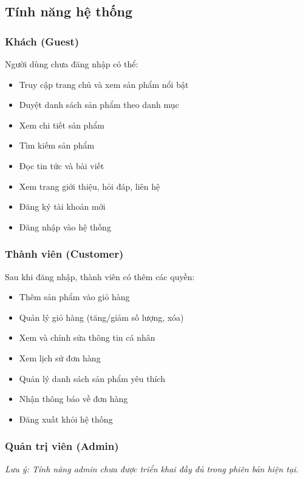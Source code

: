 \subsection{Tính năng hệ thống}

\subsubsection{Khách (Guest)}

Người dùng chưa đăng nhập có thể:
\begin{itemize}
    \item Truy cập trang chủ và xem sản phẩm nổi bật
    \item Duyệt danh sách sản phẩm theo danh mục
    \item Xem chi tiết sản phẩm
    \item Tìm kiếm sản phẩm
    \item Đọc tin tức và bài viết
    \item Xem trang giới thiệu, hỏi đáp, liên hệ
    \item Đăng ký tài khoản mới
    \item Đăng nhập vào hệ thống
\end{itemize}

\subsubsection{Thành viên (Customer)}

Sau khi đăng nhập, thành viên có thêm các quyền:
\begin{itemize}
    \item Thêm sản phẩm vào giỏ hàng
    \item Quản lý giỏ hàng (tăng/giảm số lượng, xóa)
    \item Xem và chỉnh sửa thông tin cá nhân
    \item Xem lịch sử đơn hàng
    \item Quản lý danh sách sản phẩm yêu thích
    \item Nhận thông báo về đơn hàng
    \item Đăng xuất khỏi hệ thống
\end{itemize}

\subsubsection{Quản trị viên (Admin)}

\textit{Lưu ý: Tính năng admin chưa được triển khai đầy đủ trong phiên bản hiện tại.}

